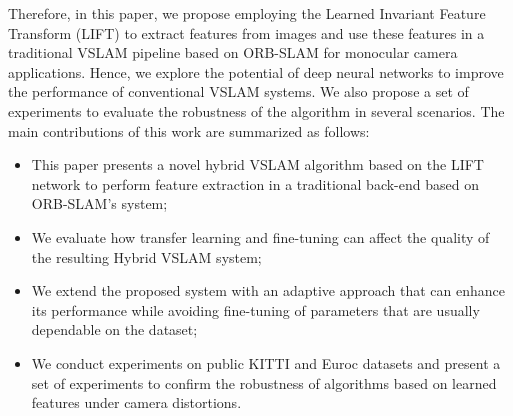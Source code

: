 Therefore, in this paper, we propose employing the Learned Invariant Feature Transform (LIFT) \cite{lift} to extract features from images and use these features in a traditional VSLAM pipeline based on ORB-SLAM \cite{orb-slam} for monocular camera applications. Hence, we explore the potential of deep neural networks to improve the performance of conventional VSLAM systems. We also propose a set of experiments to evaluate the robustness of the algorithm in several scenarios. The main contributions of this work are summarized as follows:
\begin{itemize}
    \item This paper presents a novel hybrid VSLAM algorithm based on the LIFT network to perform feature extraction in a traditional back-end based on ORB-SLAM's system;
    
    \item We evaluate how transfer learning and fine-tuning can affect the quality of the resulting Hybrid VSLAM system;
    
    \item We extend the proposed system with an adaptive approach that can enhance its performance while avoiding fine-tuning of parameters that are usually dependable on the dataset;
    
    \item We conduct experiments on public KITTI \cite{kitti-dataset} and Euroc \cite{euroc-mav} datasets and present a set of experiments to confirm the robustness of algorithms based on learned features under camera distortions.
\end{itemize}